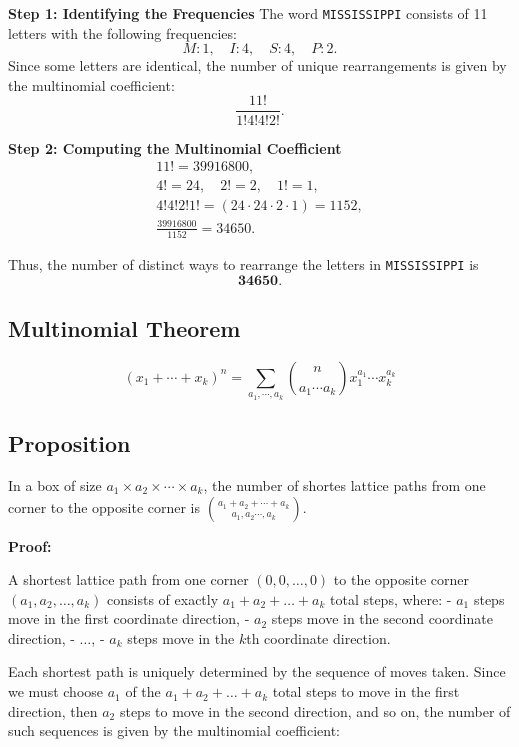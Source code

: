 \documentclass[12pt]{article}
\begin{document}
\noindent 
\textbf{Step 1: Identifying the Frequencies}  
The word \texttt{MISSISSIPPI} consists of 11 letters with the following frequencies:
\[
M: 1, \quad I: 4, \quad S: 4, \quad P: 2.
\]
Since some letters are identical, the number of unique rearrangements is given by the multinomial coefficient:
\[
\frac{11!}{1! 4! 4! 2!}.
\]

\noindent
\textbf{Step 2: Computing the Multinomial Coefficient}  
\begin{gather*}
11! = 39916800, \\
4! = 24, \quad 2! = 2, \quad 1! = 1, \\
4! 4! 2! 1! = (24 \cdot 24 \cdot 2 \cdot 1) = 1152, \\
\frac{39916800}{1152} = 34650.
\end{gather*}

\noindent
Thus, the number of distinct ways to rearrange the letters in \texttt{MISSISSIPPI} is 
\[
\mathbf{34650}.
\]

\subsection*{Multinomial Theorem} 
\[
(x_1+\cdots+x_k)^n = 
\displaystyle\sum_{a_1,\cdots,a_k} \binom{n}{a_1\cdots a_k}x_1^{a_1}\cdots x_k^{a_k}
\]

\subsection*{Proposition}
In a box of size \(a_1 \times a_2 \times \cdots \times a_k\),
the number of shortes lattice paths 
from one corner to the opposite corner is 
\(\binom{a_1+a_2+\cdots +a_k}{a_1, a_2 \cdots, a_k}\). 

\noindent 
\textbf{Proof:}

\noindent 
A shortest lattice path from one corner \((0,0,\dots,0)\) to the opposite corner \((a_1, a_2, \dots, a_k)\) consists of exactly \(a_1 + a_2 + \dots + a_k\) total steps, where:
- \(a_1\) steps move in the first coordinate direction,
- \(a_2\) steps move in the second coordinate direction,
- \(\dots\),
- \(a_k\) steps move in the \(k\)th coordinate direction.

\noindent
Each shortest path is uniquely determined by the sequence of moves taken. Since we must choose \(a_1\) of the \(a_1 + a_2 + \dots + a_k\) total steps to move in the first direction, then \(a_2\) steps to move in the second direction, and so on, the number of such sequences is given by the multinomial coefficient:
\end{document}
